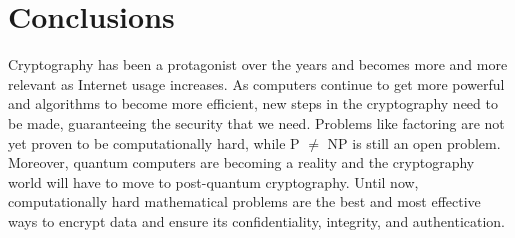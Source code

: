 \chapter{Conclusions}
Cryptography has been a protagonist over the years and becomes more and more relevant as Internet usage increases. As computers continue to get more powerful and algorithms to become more efficient, new steps in the cryptography need to be made, guaranteeing the security that we need. Problems like factoring are not yet proven to be computationally hard, while P $\neq$ NP is still an open problem. Moreover, quantum computers are becoming a reality and the cryptography world will have to move to post-quantum cryptography. Until now, computationally hard mathematical problems are the best and most effective ways to encrypt data and ensure its confidentiality, integrity, and authentication.
